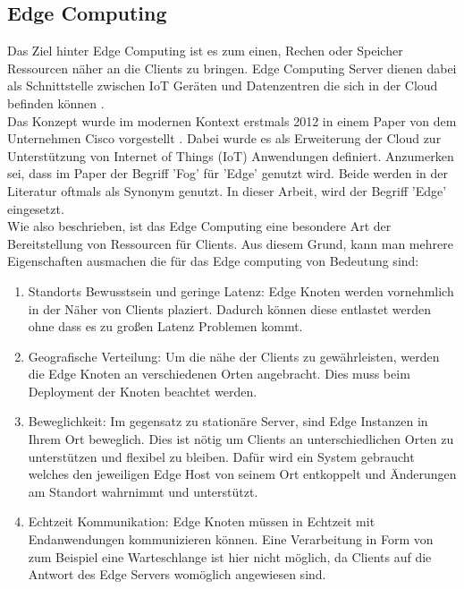 \subsection{Edge Computing}

Das Ziel hinter Edge Computing ist es zum einen, Rechen oder Speicher Ressourcen näher an die Clients zu bringen. Edge Computing Server dienen dabei als Schnittstelle zwischen IoT Geräten und Datenzentren die sich in der Cloud befinden können \cite{luntovskyyHighlyDistributedSystemsIoT2022}.\\
Das Konzept wurde im modernen Kontext erstmals 2012 in einem Paper von dem Unternehmen Cisco vorgestellt \cite{bonomiFogComputingIts}. Dabei wurde es als Erweiterung der Cloud zur Unterstützung von Internet of Things (IoT) Anwendungen definiert. Anzumerken sei, dass im Paper der Begriff 'Fog' für 'Edge' genutzt wird. Beide werden in der Literatur oftmals als Synonym genutzt. In dieser Arbeit, wird der Begriff 'Edge' eingesetzt.\\
Wie also beschrieben, ist das Edge Computing eine besondere Art der Bereitstellung von Ressourcen für Clients. Aus diesem Grund, kann man mehrere Eigenschaften ausmachen die für das Edge computing von Bedeutung sind\cite{bonomiFogComputingIts}:

\begin{enumerate}
  \item Standorts Bewusstsein und geringe Latenz: Edge Knoten werden vornehmlich in der Näher von Clients plaziert. Dadurch können diese entlastet werden ohne dass es zu großen Latenz Problemen kommt.
    \item Geografische Verteilung: Um die nähe der Clients zu gewährleisten, werden die Edge Knoten an verschiedenen Orten angebracht. Dies muss beim Deployment der Knoten beachtet werden.
      \item Beweglichkeit: Im gegensatz zu stationäre Server, sind Edge Instanzen in Ihrem Ort beweglich. Dies ist nötig um Clients an unterschiedlichen Orten zu unterstützen und flexibel zu bleiben. Dafür wird ein System gebraucht welches den jeweiligen Edge Host von seinem Ort entkoppelt und Änderungen am Standort wahrnimmt und unterstützt.
        \item Echtzeit Kommunikation: Edge Knoten müssen in Echtzeit mit Endanwendungen kommunizieren können. Eine Verarbeitung in Form von zum Beispiel eine Warteschlange ist hier nicht möglich, da Clients auf die Antwort des Edge Servers womöglich angewiesen sind.
\end{enumerate}

